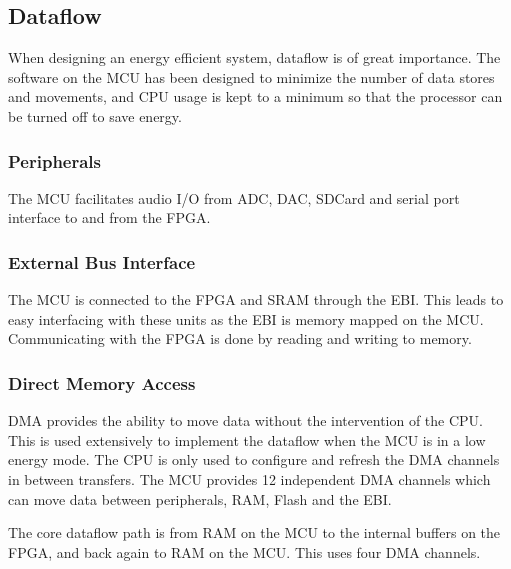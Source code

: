 
\subsection{Dataflow}

When designing an energy efficient system, dataflow is of great
importance. The software on the MCU has been designed to
minimize the number of data stores and movements, and CPU usage
is kept to a minimum so that the processor can be turned off to
save energy. 

\subsubsection{Peripherals} The MCU facilitates audio I/O from ADC,
DAC, SDCard and serial port interface to and from the FPGA.

\subsubsection{External Bus Interface} The MCU is connected to the
FPGA and SRAM through the EBI. This leads to easy interfacing
with these units as the EBI is memory mapped on the MCU.
Communicating with the FPGA is done by reading and writing to
memory.


\subsubsection{Direct Memory Access} DMA provides the ability to
move data without the intervention of the CPU. This is used
extensively to implement the dataflow when the MCU is in a low
energy mode. The CPU is only used to configure and refresh the
DMA channels in between transfers. The MCU provides 12
independent DMA channels which can move data between
peripherals, RAM, Flash and the EBI.

The core dataflow path is from RAM on the MCU to the internal
buffers on the FPGA, and back again to RAM on the MCU. This uses
four DMA channels. 

